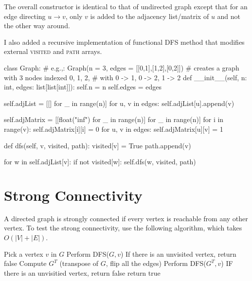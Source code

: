 
\noindent The overall constructor is identical to that of undirected graph except that for an edge directing $u \rightarrow v$, only $v$ is added to the adjacency list/matrix of $u$ and not the other way around.

\noindent I also added a recursive implementation of functional \textsc{DFS} method that modifies external \textsc{visited} and \textsc{path} arrays.

\begin{python}
class Graph:
    # e.g.,: Graph(n = 3, edges = [[0,1],[1,2],[0,2]])
    # creates a graph with 3 nodes indexed 0, 1, 2,
    # with 0 -> 1, 0 -> 2, 1 -> 2
    def __init__(self, n: int, edges: list[list[int]]):
        self.n = n
        self.edges = edges

        self.adjList = [[] for _ in range(n)]
        for u, v in edges:
            self.adjList[u].append(v)

        self.adjMatrix = [[float("inf") for _ in range(n)] for _ in range(n)]
        for i in range(v):
            self.adjMatrix[i][i] = 0
        for u, v in edges:
            self.adjMatrix[u][v] = 1

    def dfs(self, v, visited, path):
        visited[v] = True
        path.append(v)

        for w in self.adjList[v]:
            if not visited[w]:
                self.dfs(w, visited, path)
\end{python}

\section{Strong Connectivity}

A directed graph is strongly connected if every vertex is reachable from any other vertex.
To test the strong connectivity, use the following algorithm, which takes $O(|V| + |E|)$.

\noindent \hrulefill
\begin{algorithmic}[1]
    \State Pick a vertex $v$ in $G$
    \State Perform \textsc{DFS($G, v$)}
    \State If there is an unvisited vertex, return false
    \State Compute $G^T$ (transpose of $G$, flip all the edges)
    \State Perform \textsc{DFS($G^T, v$)}
    \State IF there is an unvisitied vertex, return false
    \State return true
  \EndFunction
\end{algorithmic}
\noindent \hrulefill

